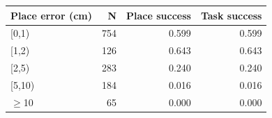 \begin{tabular}{lrrr}
\toprule
Place error (cm) & N & Place success & Task success \\
\midrule
\mbox{[0,1)} & 754 & 0.599 & 0.599 \\
\mbox{[1,2)} & 126 & 0.643 & 0.643 \\
\mbox{[2,5)} & 283 & 0.240 & 0.240 \\
\mbox{[5,10)} & 184 & 0.016 & 0.016 \\
\mbox{$\geq$10} & 65 & 0.000 & 0.000 \\
\bottomrule
\end{tabular}
